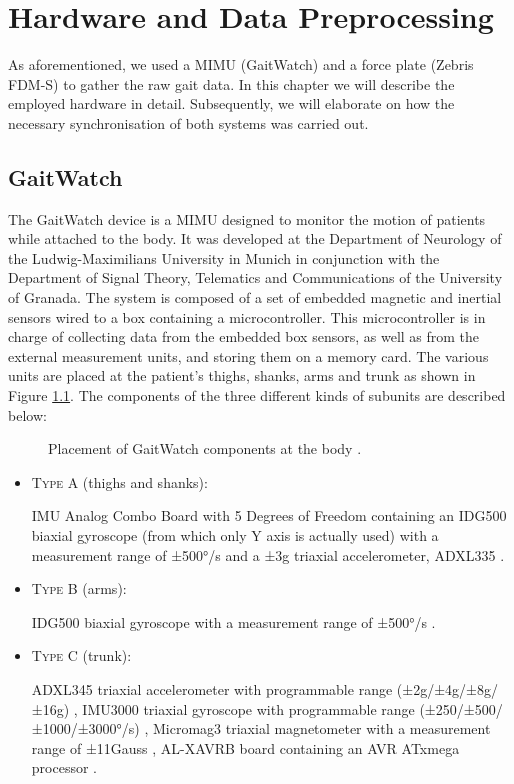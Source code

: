 \chapter{Hardware and Data Preprocessing}
\label{ch:Hardware}

As aforementioned, we used a MIMU (GaitWatch) and a force plate (Zebris FDM-S) to gather the raw gait data. In this chapter we will describe the employed hardware in detail. Subsequently, we will elaborate on how the necessary synchronisation of both systems was carried out.

\section{GaitWatch}

The GaitWatch device is a MIMU designed to monitor the motion of patients while attached to the body. It was developed at the Department of Neurology of the Ludwig-Maximilians University in Munich in conjunction with the Department of Signal Theory, Telematics and Communications of the University of Granada. The system is composed of a set of embedded magnetic and inertial sensors wired to a box containing a microcontroller. This microcontroller is in charge of collecting data from the embedded box sensors, as well as from the external measurement units, and storing them on a memory card. The various units are placed at the patient's thighs, shanks, arms and trunk as shown in Figure \ref{fig:GaitWatch_placement}. The components of the three different kinds of subunits are described below:

\begin{figure}
	\centering
	\caption{Placement of GaitWatch components at the body \cite{olivares_vicente_gaitwatch_2013}.}
	\label{fig:GaitWatch_placement}
\end{figure}

\begin{itemize}

\item \textsc{Type A} (thighs and shanks): 

IMU Analog Combo Board with 5 Degrees of Freedom \cite{IMU5} containing an IDG500 biaxial gyroscope (from which only Y axis is actually used) with a measurement range of ±500°/s \cite{IDG500} and a ±3g triaxial accelerometer, ADXL335 \cite{ADXL335}.

\item \textsc{Type B} (arms):

IDG500 biaxial gyroscope with a measurement range of ±500°/s \cite{IDG500}.

\item \textsc{Type C} (trunk):

ADXL345 triaxial accelerometer with programmable range (±2g/±4g/±8g/±16g) \cite{ADXL345},
IMU3000 triaxial gyroscope with programmable range (±250/±500/±1000/±3000°/s) \cite{IMU3000}, 
Micromag3 triaxial magnetometer with a measurement range of ±11Gauss \cite{MicroMag3}, AL-XAVRB board containing an AVR ATxmega processor \cite{AVRATxmega}.

\end{itemize}


